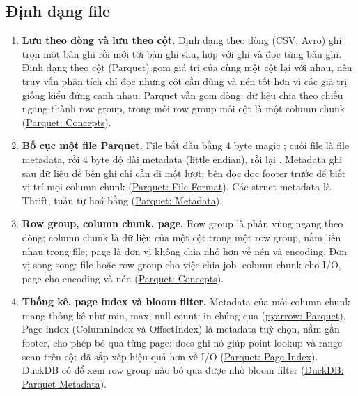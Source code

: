 \subsection{Định dạng file}
\begin{enumerate}
  \item \textbf{Lưu theo dòng và lưu theo cột.} Định dạng theo dòng (CSV, Avro) ghi trọn một bản ghi rồi mới tới bản ghi sau, hợp với ghi và đọc từng bản ghi. Định dạng theo cột (Parquet) gom giá trị của cùng một cột lại với nhau, nên truy vấn phân tích chỉ đọc những cột cần dùng và nén tốt hơn vì các giá trị giống kiểu đứng cạnh nhau. Parquet vẫn gom dòng: dữ liệu chia theo chiều ngang thành row group, trong mỗi row group mỗi cột là một column chunk (\href{https://parquet.apache.org/docs/concepts/}{Parquet: Concepts}).
  \item \textbf{Bố cục một file Parquet.} File bắt đầu bằng 4 byte magic ; cuối file là file metadata, rồi 4 byte độ dài metadata (little endian), rồi lại . Metadata ghi sau dữ liệu để bên ghi chỉ cần đi một lượt; bên đọc đọc footer trước để biết vị trí mọi column chunk (\href{https://parquet.apache.org/docs/file-format/}{Parquet: File Format}). Các struct metadata là Thrift, tuần tự hoá bằng  (\href{https://parquet.apache.org/docs/file-format/metadata/}{Parquet: Metadata}).
  \item \textbf{Row group, column chunk, page.} Row group là phân vùng ngang theo dòng; column chunk là dữ liệu của một cột trong một row group, nằm liền nhau trong file; page là đơn vị không chia nhỏ hơn về nén và encoding. Đơn vị song song: file hoặc row group cho việc chia job, column chunk cho I/O, page cho encoding và nén (\href{https://parquet.apache.org/docs/concepts/}{Parquet: Concepts}).
  \item \textbf{Thống kê, page index và bloom filter.} Metadata của mỗi column chunk mang thống kê như min, max, null count;  in chúng qua  (\href{https://arrow.apache.org/docs/python/parquet.html}{pyarrow: Parquet}). Page index (ColumnIndex và OffsetIndex) là metadata tuỳ chọn, nằm gần footer, cho phép bỏ qua từng page; docs ghi nó giúp point lookup và range scan trên cột đã sắp xếp hiệu quả hơn về I/O (\href{https://parquet.apache.org/docs/file-format/pageindex/}{Parquet: Page Index}). DuckDB có  để xem row group nào bỏ qua được nhờ bloom filter (\href{https://duckdb.org/docs/2.0/data/parquet/metadata}{DuckDB: Parquet Metadata}).

\end{enumerate}
